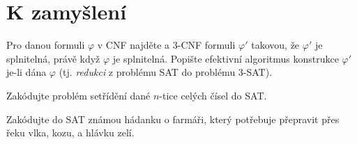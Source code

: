 \documentclass[a4paper,11pt]{amsart}
\begin{document}
\section*{K zamyšlení}
    
    
\begin{problem} 
    
    Pro danou formuli $\varphi$ v CNF najděte a 3-CNF formuli $\varphi'$ takovou, že $\varphi'$ je splnitelná, právě když $\varphi$ je splnitelná. Popište efektivní algoritmus konstrukce $\varphi'$ je-li dána $\varphi$ (tj. \emph{redukci} z problému SAT do problému 3-SAT).

\end{problem}


\begin{problem}
    Zakódujte problém setřídění dané $n$-tice celých čísel do SAT.
\end{problem}

\begin{problem}
    Zakódujte do SAT známou hádanku o farmáři, který potřebuje přepravit přes řeku vlka, kozu, a hlávku zelí.
\end{problem}

    
\end{document}
